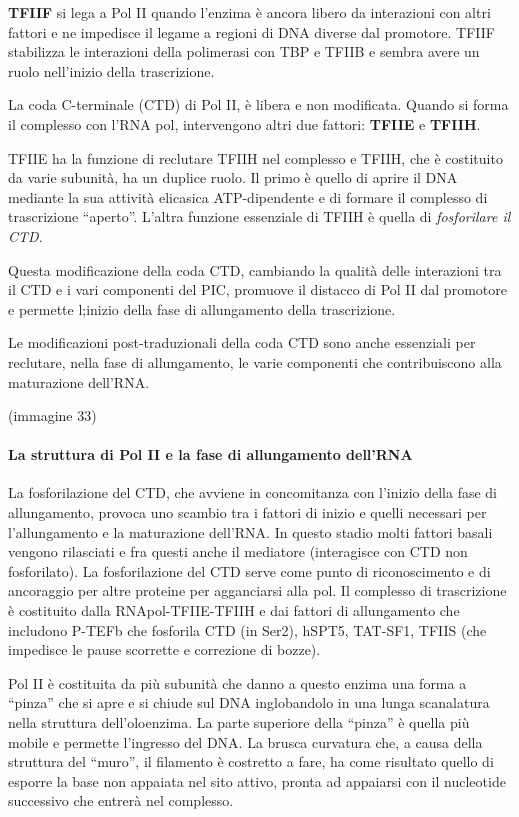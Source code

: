\documentclass[11pt]{book}
\begin{document}
\textbf{TFIIF} si lega a Pol II quando l'enzima è ancora libero da
interazioni con altri fattori e ne impedisce il legame a regioni di DNA
diverse dal promotore. TFIIF stabilizza le interazioni della polimerasi
con TBP e TFIIB e sembra avere un ruolo nell'inizio della trascrizione.

La coda C-terminale (CTD) di Pol II, è libera e non modificata. Quando
si forma il complesso con l'RNA pol, intervengono altri due fattori:
\textbf{TFIIE} e \textbf{TFIIH}.

TFIIE ha la funzione di reclutare TFIIH nel complesso e TFIIH, che è
costituito da varie subunità, ha un duplice ruolo. Il primo è quello di
aprire il DNA mediante la sua attività elicasica ATP-dipendente e di
formare il complesso di trascrizione ``aperto''. L'altra funzione
essenziale di TFIIH è quella di \emph{fosforilare il CTD}.

Questa modificazione della coda CTD, cambiando la qualità delle
interazioni tra il CTD e i vari componenti del PIC, promuove il distacco
di Pol II dal promotore e permette l;inizio della fase di allungamento
della trascrizione.

Le modificazioni post-traduzionali della coda CTD sono anche essenziali
per reclutare, nella fase di allungamento, le varie componenti che
contribuiscono alla maturazione dell'RNA.

(immagine 33)

\paragraph{La struttura di Pol II e la fase di allungamento
dell'RNA}\label{la-struttura-di-pol-ii-e-la-fase-di-allungamento-dellrna}

La fosforilazione del CTD, che avviene in concomitanza con l'inizio
della fase di allungamento, provoca uno scambio tra i fattori di inizio
e quelli necessari per l'allungamento e la maturazione dell'RNA. In
questo stadio molti fattori basali vengono rilasciati e fra questi anche
il mediatore (interagisce con CTD non fosforilato). La fosforilazione
del CTD serve come punto di riconoscimento e di ancoraggio per altre
proteine per agganciarsi alla pol. Il complesso di trascrizione è
costituito dalla RNApol-TFIIE-TFIIH e dai fattori di allungamento che
includono P-TEFb che fosforila CTD (in Ser2), hSPT5, TAT-SF1, TFIIS (che
impedisce le pause scorrette e correzione di bozze).

Pol II è costituita da più subunità che danno a questo enzima una forma
a ``pinza'' che si apre e si chiude sul DNA inglobandolo in una lunga
scanalatura nella struttura dell'oloenzima. La parte superiore della
``pinza'' è quella più mobile e permette l'ingresso del DNA. La brusca
curvatura che, a causa della struttura del ``muro'', il filamento è
costretto a fare, ha come risultato quello di esporre la base non
appaiata nel sito attivo, pronta ad appaiarsi con il nucleotide
successivo che entrerà nel complesso.
\end{document}
